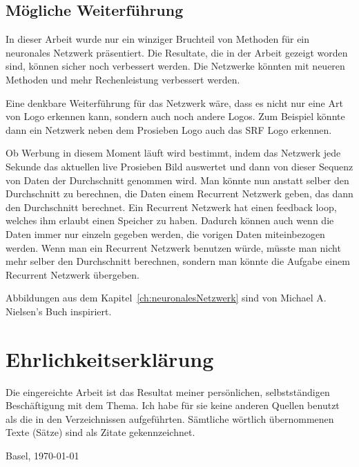 \documentclass[12pt,a4paper]{report}
\begin{document}
\section{Mögliche Weiterführung}
In dieser Arbeit wurde nur ein winziger Bruchteil von Methoden für ein neuronales Netzwerk präsentiert.
Die Resultate, die in der Arbeit gezeigt worden sind, können sicher noch verbessert werden.
Die Netzwerke könnten mit neueren Methoden und mehr Rechenleistung verbessert werden.

Eine denkbare Weiterführung für das Netzwerk wäre, dass es nicht nur eine Art von Logo erkennen kann, sondern auch noch andere Logos.
Zum Beispiel könnte dann ein Netzwerk neben dem Prosieben Logo auch das SRF Logo erkennen.

Ob Werbung in diesem Moment läuft wird bestimmt,
indem das Netzwerk jede Sekunde das aktuellen live Prosieben Bild auswertet und dann von dieser Sequenz von Daten der Durchschnitt genommen wird.
Man könnte nun anstatt selber den Durchschnitt zu berechnen, die Daten einem Recurrent Netzwerk geben, das dann den Durchschnitt berechnet.
Ein Recurrent Netzwerk hat einen feedback loop, welches ihm erlaubt einen Speicher zu haben\cite{wiki:rnn}.
Dadurch können auch wenn die Daten immer nur einzeln gegeben werden, die vorigen Daten miteinbezogen werden.
Wenn man ein Recurrent Netzwerk benutzen würde, müsste man nicht mehr selber den Durchschnitt berechnen,
sondern man könnte die Aufgabe einem Recurrent Netzwerk übergeben.


\clearpage
{}
{}



\clearpage
{}
{}
\listoffigures
Abbildungen aus dem Kapitel~\ref{ch:neuronalesNetzwerk} sind von Michael A. Nielsen's Buch\cite{neuralbook} inspiriert.

\appendix


\chapter*{Ehrlichkeitserklärung}

Die eingereichte Arbeit ist das Resultat meiner persönlichen, selbstständigen Beschäftigung mit dem Thema.
Ich habe für sie keine anderen Quellen benutzt als die in den Verzeichnissen aufgeführten.
Sämtliche wörtlich übernommenen Texte (Sätze) sind als Zitate gekennzeichnet.

\vspace{2cm}
Basel, \today
\end{document}
